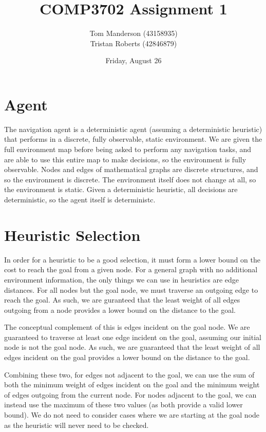 \documentclass[11pt,a4paper]{article}
\title{COMP3702 Assignment 1}
\author{
Tom Manderson (43158935)
\\
Tristan Roberts (42846879)
}
\date{Friday, August 26}
\begin{document}
\maketitle
\tableofcontents
\clearpage

\section{Agent}
The navigation agent is a deterministic agent (assuming a deterministic heuristic) that performs in a discrete, fully observable, static environment. We are given the full environment map before being asked to perform any navigation tasks, and are able to use this entire map to make decisions, so the environment is fully observable. Nodes and edges of mathematical graphs are discrete structures, and so the environment is discrete. The environment itself does not change at all, so the environment is static. Given a deterministic heuristic, all decisions are deterministic, so the agent itself is deterministc.


\section{Heuristic Selection}
In order for a heuristic to be a good selection, it must form a lower bound on the cost to reach the goal from a given node. For a general graph with no additional environment information, the only things we can use in heuristics are edge distances. For all nodes but the goal node, we must traverse an outgoing edge to reach the goal. As such, we are guranteed that the least weight of all edges outgoing from a node provides a lower bound on the distance to the goal.

The conceptual complement of this is edges incident on the goal node. We are guaranteed to traverse at least one edge incident on the goal, assuming our initial node is not the goal node. As such, we are guaranteed that the least weight of all edges incident on the goal provides a lower bound on the distance to the goal.

Combining these two, for edges not adjacent to the goal, we can use the sum of both the minimum weight of edges incident on the goal and the minimum weight of edges outgoing from the current node. For nodes adjacent to the goal, we can instead use the maximum of these two values (as both provide a valid lower bound). We do not need to consider cases where we are starting at the goal node as the heuristic will never need to be checked.
\end{document}
